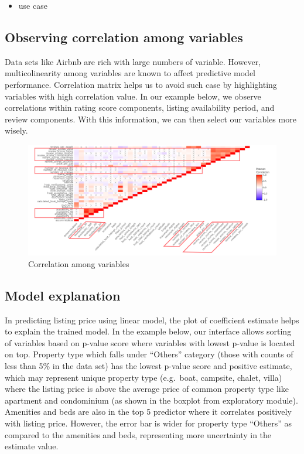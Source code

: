 \documentclass{acm_proc_article-sp}
\providecommand{\tightlist}{%
  \setlength{\itemsep}{0pt}\setlength{\parskip}{0pt}}
\begin{document}
\begin{itemize}
\tightlist
\item
  use case
\end{itemize}

\hypertarget{observing-correlation-among-variables}{%
\subsection{Observing correlation among
variables}\label{observing-correlation-among-variables}}

Data sets like Airbnb are rich with large numbers of variable. However,
multicolinearity among variables are known to affect predictive model
performance. Correlation matrix helps us to avoid such case by
highlighting variables with high correlation value. In our example
below, we observe correlations within rating score components, listing
availability period, and review components. With this information, we
can then select our variables more wisely.

\begin{figure}[H]

{\centering \includegraphics[width=1\linewidth]{images/corrcase} 

}

\caption{Correlation among variables}\label{fig:unnamed-chunk-13}
\end{figure}

\hypertarget{model-explanation}{%
\subsection{Model explanation}\label{model-explanation}}

In predicting listing price using linear model, the plot of coefficient
estimate helps to explain the trained model. In the example below, our
interface allows sorting of variables based on p-value score where
variables with lowest p-value is located on top. Property type which
falls under ``Others'' category (those with counts of less than 5\% in
the data set) has the lowest p-value score and positive estimate, which
may represent unique property type (e.g.~boat, campsite, chalet, villa)
where the listing price is above the average price of common property
type like apartment and condominium (as shown in the boxplot from
exploratory module). Amenities and beds are also in the top 5 predictor
where it correlates positively with listing price. However, the error
bar is wider for property type ``Others'' as compared to the amenities
and beds, representing more uncertainty in the estimate value.
\end{document}
